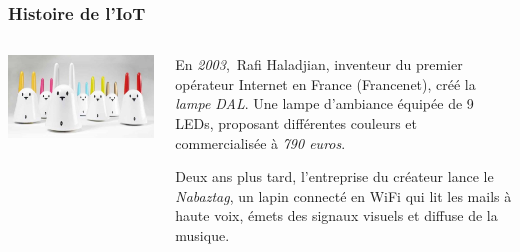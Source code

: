 \documentclass[aspectratio=169,utf8,french]{beamer}
\begin{document}
\begin{frame}
  \frametitle{Histoire de l'IoT}
  \begin{columns}
    \begin{column}{.3\textwidth}
      \includegraphics[width=\textwidth]{pictures/nabaztag.jpg}
    \end{column}
    \begin{column}{.7\textwidth}
      En \emph{2003}, Rafi Haladjian, inventeur du premier opérateur Internet en France (Francenet), créé la \emph{lampe DAL}. Une lampe d’ambiance équipée de 9 LEDs, proposant différentes couleurs et commercialisée à \emph{790 euros}.

      Deux ans plus tard, l’entreprise du créateur lance le \emph{Nabaztag}, un lapin connecté en WiFi qui lit les mails à haute voix, émets des signaux visuels et diffuse de la musique.
    \end{column}
  \end{columns}
\end{frame}
\end{document}
